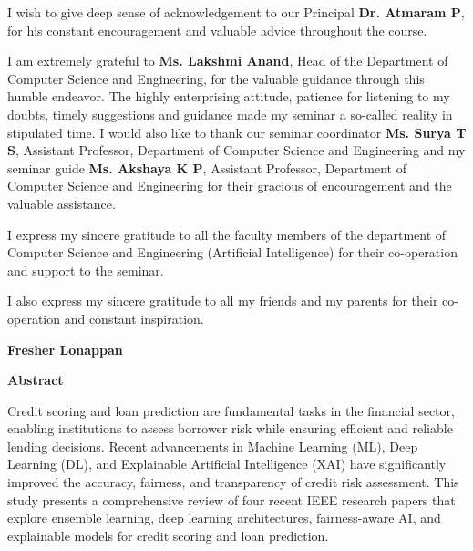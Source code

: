 \documentclass[12pt,a4paper,final]{extreport}
\begin{document}
I wish to give deep sense of acknowledgement to our Principal \textbf{Dr. Atmaram P}, for his constant encouragement and valuable advice throughout the course.

I am extremely grateful to \textbf{Ms. Lakshmi Anand}, Head of the Department of Computer Science and Engineering, for the valuable guidance through this humble endeavor. The highly enterprising attitude, patience for listening to my doubts, timely suggestions and guidance made my seminar a so-called reality in stipulated time.
I would also like to thank our seminar coordinator \textbf{Ms. Surya T S}, Assistant Professor, Department of Computer Science and Engineering and my seminar guide \textbf{Ms. Akshaya K P}, Assistant Professor, Department of Computer Science and Engineering for their gracious of encouragement and the valuable assistance.

I express my sincere gratitude to all the faculty members of the department of Computer Science and Engineering (Artificial Intelligence) for their co-operation and support to the seminar.

I also express my sincere gratitude to all my friends and my parents for their co-operation and constant inspiration.

\vspace{2cm}
\noindent\hfill
\begin{minipage}[t]{0.4\textwidth}
\centering
\textbf{Fresher Lonappan}
\end{minipage}

\newpage

\begin{center}
\begin{huge}
\textbf{Abstract}
\end{huge}
\end{center}

\vskip0.3cm

\begingroup
{}
Credit scoring and loan prediction are fundamental tasks in the financial sector, enabling institutions to assess borrower risk while ensuring efficient and reliable lending decisions. Recent advancements in Machine Learning (ML), Deep Learning (DL), and Explainable Artificial Intelligence (XAI) have significantly improved the accuracy, fairness, and transparency of credit risk assessment. This study presents a comprehensive review of four recent IEEE research papers that explore ensemble learning, deep learning architectures, fairness-aware AI, and explainable models for credit scoring and loan prediction.
\end{document}
